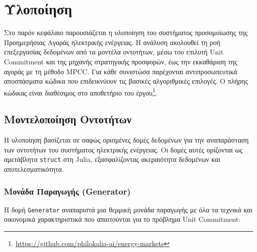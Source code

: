 % 

\chapter{Υλοποίηση}
\label{ch:implementation}

Στο παρόν κεφάλαιο παρουσιάζεται η υλοποίηση του συστήματος προσομοίωσης της Προημερήσιας Αγοράς ηλεκτρικής ενέργειας. Η ανάλυση ακολουθεί τη ροή επεξεργασίας δεδομένων από τα μοντέλα οντοτήτων, μέσω του επιλυτή Unit Commitment και της μηχανής στρατηγικής προσφορών, έως την εκκαθάριση της αγοράς με τη μέθοδο MPCC. Για κάθε συνιστώσα παρέχονται αντιπροσωπευτικά αποσπάσματα κώδικα που επιδεικνύουν τις βασικές αλγοριθμικές επιλογές. Ο πλήρης κώδικας είναι διαθέσιμος στο αποθετήριο του έργου\footnote{\url{https://github.com/philokalia-ai/energy-markets}}.


\section{Μοντελοποίηση Οντοτήτων}
\label{sec:entity-modeling}

Η υλοποίηση βασίζεται σε σαφώς ορισμένες δομές δεδομένων για την αναπαράσταση των οντοτήτων του συστήματος ηλεκτρικής ενέργειας. Οι δομές αυτές ορίζονται ως αμετάβλητα \texttt{struct} στη Julia, εξασφαλίζοντας ακεραιότητα δεδομένων και αποτελεσματικότητα.

\subsection{Μονάδα Παραγωγής (Generator)}
\label{subsec:generator-struct}

Η δομή \texttt{Generator} αναπαριστά μια θερμική μονάδα παραγωγής με όλα τα τεχνικά και οικονομικά χαρακτηριστικά που απαιτούνται για το πρόβλημα Unit Commitment:

